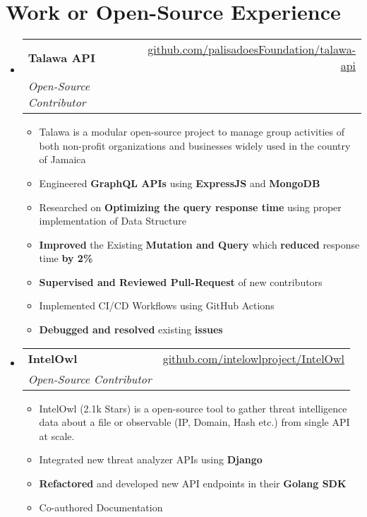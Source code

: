\documentclass[letterpaper,11pt]{article}
\makeatletter
\newcommand{\resumeItem}[1]{
  \item\small{
    {#1 \vspace{-2pt}}
  }
}
\newcommand{\resumeSubheading}[4]{
  \vspace{-2pt}\item
    \begin{tabular*}{0.97\textwidth}[t]{l@{\extracolsep{\fill}}r}
      \textbf{#1} & #2 \\
      \textit{\small#3} & \textit{\small #4} \\
    \end{tabular*}\vspace{-7pt}
}
\newcommand{\resumeSubSubheading}[2]{
    \item
    \begin{tabular*}{0.97\textwidth}{l@{\extracolsep{\fill}}r}
      \textit{\small#1} & \textit{\small #2} \\
    \end{tabular*}\vspace{-7pt}
}
\newcommand{\resumeSubHeadingListStart}{\begin{itemize}[leftmargin=0.15in, label={}]}
\newcommand{\resumeSubHeadingListEnd}{\end{itemize}}
\newcommand{\resumeItemListStart}{\begin{itemize}}
\newcommand{\resumeItemListEnd}{\end{itemize}\vspace{-5pt}}
\makeatother
\begin{document}
\section{Work or Open-Source Experience}
  \resumeSubHeadingListStart
    \resumeSubheading
      {Talawa API}{\href{https://github.com/palisadoesFoundation/talawa-api}{github.com/palisadoesFoundation/talawa-api}}
      {Open-Source Contributor}{}
      \resumeItemListStart
        \resumeItem{Talawa is a modular open-source project to manage group activities of both non-profit organizations and businesses widely used in the
country of Jamaica}
        \resumeItem{Engineered \textbf{GraphQL APIs} using \textbf{ExpressJS} and \textbf{MongoDB}}
        \resumeItem{Researched on \textbf{Optimizing the query response time} using proper implementation of Data Structure}
        \resumeItem{\textbf{Improved} the Existing \textbf{Mutation and Query} which \textbf{reduced} response time \textbf{by 2\%}}
        \resumeItem{\textbf{Supervised and Reviewed Pull-Request} of new contributors}
        \resumeItem{Implemented CI/CD Workflows using GitHub Actions}
        \resumeItem{\textbf{Debugged and resolved} existing \textbf{issues}}
      \resumeItemListEnd
      
    \resumeSubheading
      {IntelOwl}{\href{https://github.com/intelowlproject/IntelOwl}{github.com/intelowlproject/IntelOwl}}
      {Open-Source Contributor}{}
      \resumeItemListStart
        \resumeItem{IntelOwl (2.1k Stars) is a open-source tool to gather threat intelligence data about a
file or observable (IP, Domain, Hash etc.) from single API at scale.}
        \resumeItem{Integrated new threat analyzer APIs using \textbf{Django}}
        \resumeItem{\textbf{Refactored} and developed new API endpoints in their \textbf{Golang SDK}}
        \resumeItem{Co-authored Documentation}
      \resumeItemListEnd


  \resumeSubHeadingListEnd


\end{document}
